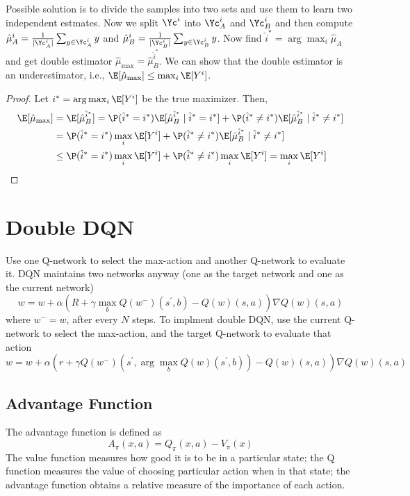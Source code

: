 \noindent Possible solution is to divide the samples into two sets and use them to learn two independent estmates. Now we split $\Yc^i$ into $\Yc_{A}^i$ and $\Yc_{B}^i$ and then compute $\hat{\mu}_{A}^i = \frac{1}{|\Yc_{A}^i|} \sum_{y\in\Yc_{A}^i} y$ and $\hat{\mu}_{B}^i = \frac{1}{|\Yc_{B}^i|} \sum_{y\in\Yc_{B}^i} y$. Now find $\hat{i}^* = \arg\max_{i}\hat{\mu}_{A}$ and get double estimator $\hat{\mu}_\text{max} = \hat{\mu}_B^{\hat{i}^*}$. We can show that the double estimator is an underestimator, i.e., $\E[\hat{\mu}_{\text{max}}] \leq \max_{i} \E[Y^i]$.
\begin{proof}
  Let $i^* = \arg\max_{i} \E[Y^i]$ be the true maximizer. Then,
  \begin{align*}
    \E[\hat{\mu}_{\text{max}}] & = \E[\hat{\mu}_B^{\hat{i}^*}] = \P(\hat{i}^* = i^*) \E[\hat{\mu}_{B}^{\hat{i}^*} \mid \hat{i}^* = i^*] + \P(\hat{i}^* \neq i^*) \E[\hat{\mu}_{B}^{\hat{i}^*} \mid \hat{i}^* \neq i^*] \\
                               & = \P(\hat{i}^* = i^*) \max_{i} \E[Y^i] + \P(\hat{i}^* \neq i^*) \E[\hat{\mu}_{B}^{\hat{i}^*} \mid \hat{i}^* \neq i^*]                                                                 \\
                               & \leq \P(\hat{i}^* = i^*) \max_{i} \E[Y^i] + \P(\hat{i}^* \neq i^*) \max_{i} \E[Y^i] = \max_{i} \E[Y^i]
  \end{align*}
\end{proof}
\section{Double DQN}
Use one Q-network to select the max-action and another Q-network to evaluate it. DQN maintains two networks anyway (one as the target
network and one as the current network)
\[
  w = w + \alpha(R + \gamma \max_{b}Q(w^-)(s^{\prime}, b) - Q(w)(s,a)) \nabla Q(w)(s,a)
\]
where $w^- = w$, after every $N$ steps. To implment double DQN, use the current Q-network to select the max-action, and the target
Q-network to evaluate that action
\[
  w = w + \alpha(r + \gamma Q(w^-)(s^{\prime}, \arg\max_{b} Q(w)(s^{\prime}, b)) - Q(w)(s,a)) \nabla Q(w)(s,a)
\]

\subsection{Advantage Function}
The advantage function is defined as
\[
  A_\pi (x,a) = Q_\pi (x,a) - V_\pi(x)
\]
The value function measures how good it is to be in a particular state; the Q function measures the value of choosing particular action when in that state; the advantage function obtains a relative measure of the importance of each action.

